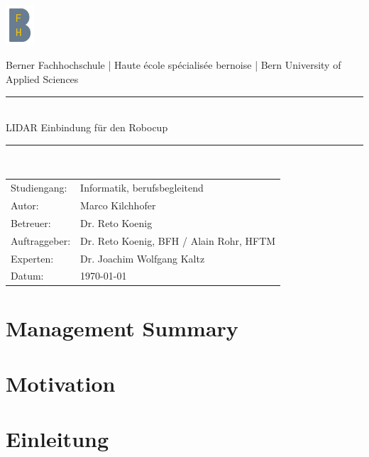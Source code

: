 \documentclass[11pt,english,german]{report}
\begin{document}
\begin{titlepage}
\begin{center}
	
\includegraphics[width=0.08\textwidth]{img/logo/bfh_logo.png}

Berner Fachhochschule | Haute école spécialisée bernoise | Bern University of Applied Sciences
\vspace{20mm}

\newcommand{\HRule}{\rule{\linewidth}{0.3mm}}
\HRule \\[0.4cm]
{\huge LIDAR Einbindung für den Robocup}\\[0.3cm]
{\huge \bfseries  }
\HRule \\[2cm]


\vfill
\end{center}
\begin{tabular}{ll}
	Studiengang:  & Informatik, berufsbegleitend \\
	Autor:        & Marco Kilchhofer \\
	Betreuer:     & Dr. Reto Koenig\\
	Auftraggeber: & Dr. Reto Koenig, BFH / Alain Rohr, HFTM\\
	Experten:     & Dr. Joachim Wolfgang Kaltz\\
	Datum:        & \today\\
\end{tabular}

\end{titlepage}



\tableofcontents

\chapter*{Management Summary}


\chapter*{Motivation}



\chapter{Einleitung}
\end{document}
